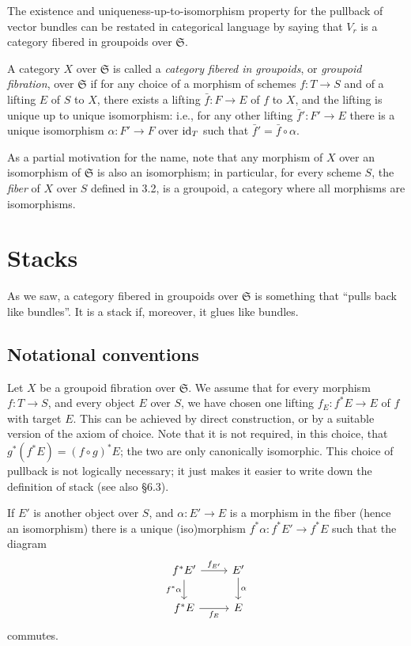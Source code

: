 \documentclass[12pt]{memoir}
\begin{document}
The existence and uniqueness-up-to-isomorphism property for the pullback of vector bundles can be restated in categorical language by saying that $V_r$ is a category fibered in groupoids over $\mathfrak{S}$.

\begin{Def}\label{def:3.1}
A category $X$ over $\mathfrak{S}$ is called a \emph{category fibered in groupoids}, or \emph{groupoid fibration}, over $\mathfrak{S}$ if for any choice of a morphism of schemes $f\colon T \to S$ and of a lifting $E$ of $S$ to $X$, there exists a lifting $\bar{f}\colon F \to E$ of $f$ to $X$, and the lifting is unique up to unique isomorphism: i.e., for any other lifting $\bar{f}'\colon F' \to E$ there is a unique isomorphism $\alpha\colon F' \to F$ over $\operatorname{id}_T$ such that $\bar{f}' = \bar{f} \circ \alpha$.
\end{Def}

As a partial motivation for the name, note that any morphism of $X$ over an isomorphism of $\mathfrak{S}$ is also an isomorphism; in particular, for every scheme $S$, the \emph{fiber} of $X$ over $S$ defined in 3.2, is a groupoid, a category where all morphisms are isomorphisms.

\section{Stacks}

As we saw, a category fibered in groupoids over $\mathfrak{S}$ is something that ``pulls back like bundles''. It is a stack if, moreover, it glues like bundles.

\subsection{Notational conventions}

Let $X$ be a groupoid fibration over $\mathfrak{S}$. We assume that for every morphism $f\colon T \to S$, and every object $E$ over $S$, we have chosen one lifting $f_E\colon f^* E \to E$ of $f$ with target $E$. This can be achieved by direct construction, or by a suitable version of the axiom of choice. Note that it is not required, in this choice, that $g^*(f^* E) = (f \circ g)^* E$; the two are only canonically isomorphic. This choice of pullback is not logically necessary; it just makes it easier to write down the definition of stack (see also \S 6.3).


If $E'$ is another object over $S$, and $\alpha\colon E' \to E$ is a morphism in the fiber (hence an isomorphism) there is a unique (iso)morphism $f^*\alpha\colon f^* E' \to f^* E$ such that the diagram
$$
\begin{tikzcd}
f^*E' \arrow[r, "f_{E'}"] \arrow[d, "f^*\alpha"'] & E' \arrow[d, "\alpha"] \\
f^*E \arrow[r, "f_E"'] & E
\end{tikzcd}
$$
commutes.
\end{document}
